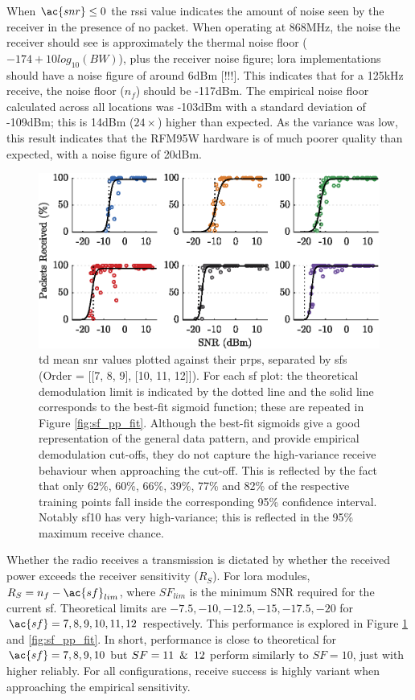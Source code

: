 When $\ac{snr} \leq 0$ the \ac{rssi} value indicates the amount of noise seen by the receiver in the presence of no packet. When operating at 868MHz, the noise the receiver should see is approximately the thermal noise floor ($-174+10log_{10}(BW)$), plus the receiver noise figure; \ac{lora} implementations should have a noise figure of around 6dBm [!!!]. This indicates that for a 125kHz receive, the noise floor ($n_f$) should be -117dBm. The empirical noise floor calculated across all locations was -103dBm with a standard deviation of -109dBm; this is 14dBm ($24\times$) higher than expected. As the variance was low, this result indicates that the RFM95W hardware is of much poorer quality than expected, with a noise figure of 20dBm.
\vspace{0.5cm}
\begin{figure}[H]
    \centering
   	\includegraphics{Figures/sf_pp_separate_plot}
    \caption[Plots of \ac{snr} vs \ac{prp}]{
   \ac{td} mean \ac{snr} values plotted against their \ac{prp}s, separated by \ac{sf}s (Order = [[7, 8, 9], [10, 11, 12]]). For each \ac{sf} plot: the theoretical demodulation limit is indicated by the dotted line and the solid line corresponds to the best-fit sigmoid function; these are repeated in Figure \ref{fig:sf_pp_fit}. Although the best-fit sigmoids give a good representation of the general data pattern, and provide empirical demodulation cut-offs, they do not capture the high-variance receive behaviour when approaching the cut-off. This is reflected by the fact that only 62\%, 60\%, 66\%, 39\%, 77\% and 82\% of the respective training points fall inside the corresponding 95\% confidence interval. Notably \ac{sf}10 has very high-variance; this is reflected in the 95\% maximum receive chance. 
    }
    \label{fig:sf_pp_separate}
\end{figure}

Whether the radio receives a transmission is dictated by whether the received power exceeds the receiver sensitivity ($R_S$). For \ac{lora} modules, $R_S = n_f - \ac{sf}_{lim}$, where $SF_{lim}$ is the minimum SNR required for the current \ac{sf}. Theoretical limits are $-7.5, -10, -12.5, -15, -17.5, -20$ for $\ac{sf} = 7, 8, 9, 10, 11, 12$ respectively. This performance is explored in Figure \ref{fig:sf_pp_separate} and \ref{fig:sf_pp_fit}. In short, performance is close to theoretical for $\ac{sf} = 7, 8, 9, 10$ but $SF=11\enskip \& \enskip 12$ perform similarly to $SF=10$, just with higher reliably. For all configurations, receive success is highly variant when approaching the empirical sensitivity.

